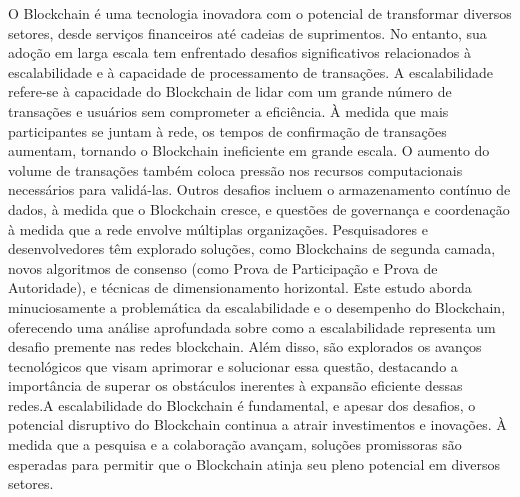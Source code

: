 \begin{resumo}


    O Blockchain é uma tecnologia inovadora com o potencial de transformar diversos setores, desde serviços financeiros até cadeias de suprimentos. No entanto, sua adoção em larga escala tem enfrentado desafios significativos relacionados à escalabilidade e à capacidade de processamento de transações. A escalabilidade refere-se à capacidade do Blockchain de lidar com um grande número de transações e usuários sem comprometer a eficiência. À medida que mais participantes se juntam à rede, os tempos de confirmação de transações aumentam, tornando o Blockchain ineficiente em grande escala. O aumento do volume de transações também coloca pressão nos recursos computacionais necessários para validá-las. Outros desafios incluem o armazenamento contínuo de dados, à medida que o Blockchain cresce, e questões de governança e coordenação à medida que a rede envolve múltiplas organizações. Pesquisadores e desenvolvedores têm explorado soluções, como Blockchains de segunda camada, novos algoritmos de consenso (como Prova de Participação e Prova de Autoridade), e técnicas de dimensionamento horizontal. Este estudo aborda minuciosamente a problemática da escalabilidade e o desempenho do Blockchain, oferecendo uma análise aprofundada sobre como a escalabilidade representa um desafio premente nas redes blockchain. Além disso, são explorados os avanços tecnológicos que visam aprimorar e solucionar essa questão, destacando a importância de superar os obstáculos inerentes à expansão eficiente dessas redes.A escalabilidade do Blockchain é fundamental, e apesar dos desafios, o potencial disruptivo do Blockchain continua a atrair investimentos e inovações. À medida que a pesquisa e a colaboração avançam, soluções promissoras são esperadas para permitir que o Blockchain atinja seu pleno potencial em diversos setores.
    
    \end{resumo}
